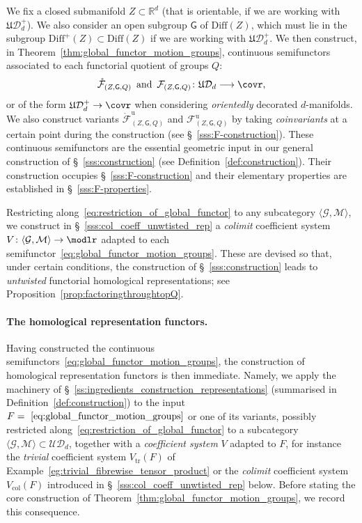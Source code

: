 \documentclass[AHL,Unicode,published]{cedram}
\newcommand{\Diff}{\mathrm{Diff}}
\newcommand{\Int}{\mathring}
\newcommand{\triv}{\mathrm{tr}}
\newcommand{\col}{\mathrm{col}}
\newcommand{\unt}{\mathrm{u}}
\newcommand{\fU}{\ensuremath{\mathfrak{U}}}
\newcommand{\sG}{\mathsf{G}}
\newcommand{\cD}{\mathcal{D}}
\newcommand{\cF}{\mathcal{F}}
\newcommand{\cG}{\mathcal{G}}
\newcommand{\cM}{\mathcal{M}}
\newcommand{\cU}{\mathcal{U}}
\newcommand{\bR}{\mathbb{R}}
\newcommand{\too}{\ensuremath{\longrightarrow}}
\begin{document}
We fix a closed submanifold $Z \subset \bR^d$ (that is orientable, if we are working with $\fU\cD_{d}^{+}$). We also consider an open subgroup $\sG$ of $\Diff(Z)$, which must lie in the subgroup $\Diff^{+}(Z) \subset \Diff(Z)$ if we are working with $\fU\cD_{d}^{+}$. We then construct, in Theorem~\ref{thm:global_functor_motion_groups}, continuous semifunctors associated to each functorial quotient of groups $Q$:
\begin{equation}\label{eq:global_functor_motion_groups}
\Int{\cF}_{(Z,\sG,Q)} \,\text{ and }\, \cF_{(Z,\sG,Q)} \colon \fU\cD_{d} \too \covr,
\end{equation}
or of the form $\fU\cD_{d}^{+} \to \covr$ when considering \emph{orientedly} decorated $d$-manifolds. We also construct variants $\Int{\cF}^{\unt}_{(Z,\sG,Q)}$ and $\cF^{\unt}_{(Z,\sG,Q)}$ by taking \emph{coinvariants} at a certain point during the construction (see \S~\ref{sss:F-construction}). These continuous semifunctors are the essential geometric input in our general construction of \S~\ref{sss:construction} (see Definition~\ref{def:construction}). Their construction occupies \S~\ref{sss:F-construction} and their elementary properties are established in \S~\ref{sss:F-properties}.

Restricting along~\eqref{eq:restriction_of_global_functor} to any subcategory $\langle \cG, \cM \rangle$, we construct in \S~\ref{sss:col_coeff_unwtisted_rep} a \emph{colimit} coefficient system $V \colon \langle \cG, \cM \rangle \to \modlr$ adapted to each semifunctor~\eqref{eq:global_functor_motion_groups}. These are devised so that, under certain conditions, the construction of \S~\ref{sss:construction} leads to \emph{untwisted} functorial homological representations; see Proposition~\ref{prop:factoringthroughtopQ}.


\paragraph*{The homological representation functors.}

Having constructed the continuous semifunctors~\eqref{eq:global_functor_motion_groups}, the construction of homological representation functors is then immediate. Namely, we apply the machinery of \S~\ref{ss:ingredients_construction_representations} (summarised in Definition~\ref{def:construction}) to the input $F =~\eqref{eq:global_functor_motion_groups}$ or one of its variants, possibly restricted along~\eqref{eq:restriction_of_global_functor} to a subcategory $\langle \cG, \cM \rangle \subset \cU\cD_{d}$, together with a \emph{coefficient system} $V$ adapted to $F$, for instance the \emph{trivial} coefficient system $V_{\triv}(F)$ of Example~\ref{eg:trivial_fibrewise_tensor_product} or the \emph{colimit} coefficient system $V_{\col}(F)$ introduced in \S~\ref{sss:col_coeff_unwtisted_rep} below. Before stating the core construction of Theorem~\ref{thm:global_functor_motion_groups}, we record this consequence.
\end{document}
